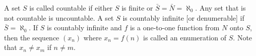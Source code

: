 A set $S$ is called countable if either $S$ is finite or $\bar{S} = \bar{N} = \aleph_0$. Any set that is not countable is uncountable. A set $S$ is countably infinite [or denumerable] if $\bar{S} = \aleph_0$. If $S$ is countably infinite and $f$ is a one-to-one function from $N$ onto $S$, then the sequence $(x_n)$ where $x_n = f(n)$ is called an enumeration of $S$. Note that $x_n \neq x_m$ if $n \neq m$.